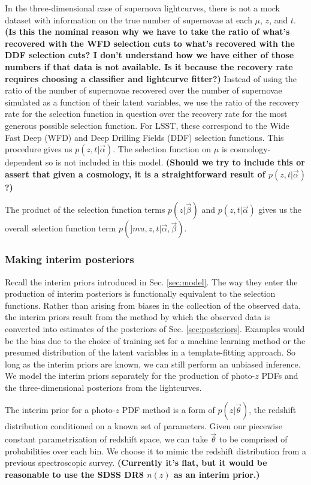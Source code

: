 \documentclass[12pt, onecolumn]{emulateapj}
\begin{document}
In the three-dimensional case of supernova lightcurves, there is not a mock dataset with information on the true number of supernovae at each $\mu$, $z$, and $t$.  \textbf{(Is this the nominal reason why we have to take the ratio of what's recovered with the WFD selection cuts to what's recovered with the DDF selection cuts?  I don't understand how we have either of those numbers if that data is not available.  Is it because the recovery rate requires choosing a classifier and lightcurve fitter?)}  Instead of using the ratio of the number of supernovae recovered over the number of supernovae simulated as a function of their latent variables, we use the ratio of the recovery rate for the selection function in question over the recovery rate for the most generous possible selection function.  For LSST, these correspond to the Wide Fast Deep (WFD) and Deep Drilling Fields (DDF) selection functions.  This procedure gives us $p(z, t | \vec{\alpha})$.  The selection function on $\mu$ is cosmology-dependent so is not included in this model.  \textbf{(Should we try to include this or assert that given a cosmology, it is a straightforward result of $p(z, t | \vec{\alpha})$?)}

The product of the selection function terms $p(z | \vec{\beta})$ and $p(z, t | \vec{\alpha})$ gives us the overall selection function term $p(]mu, z, t | \vec{\alpha}, \vec{\beta})$.

\subsubsection{Making interim posteriors}
\label{sec:interimpriors}

Recall the interim priors introduced in Sec. \ref{sec:model}.  The way they enter the production of interim posteriors is functionally equivalent to the selection functions.  Rather than arising from biases in the collection of the observed data, the interim priors result from the method by which the observed data is converted into estimates of the posteriors of Sec. \ref{sec:posteriors}.  Examples would be the bias due to the choice of training set for a machine learning method or the presumed distribution of the latent variables in a template-fitting approach.  So long as the interim priors are known, we can still perform an unbiased inference.  We model the interim priors separately for the production of photo-$z$ PDFs and the three-dimensional posteriors from the lightcurves.  

The interim prior for a photo-$z$ PDF method is a form of $p(z | \vec{\theta})$, the redshift distribution conditioned on a known set of parameters.  Given our piecewise constant parametrization of redshift space, we can take $\vec{\theta}$ to be comprised of probabilities over each bin.  We choose it to mimic the redshift distribution from a previous spectroscopic survey.  \textbf{(Currently it's flat, but it would be reasonable to use the SDSS DR8 $n(z)$ as an interim prior.)}
\end{document}
